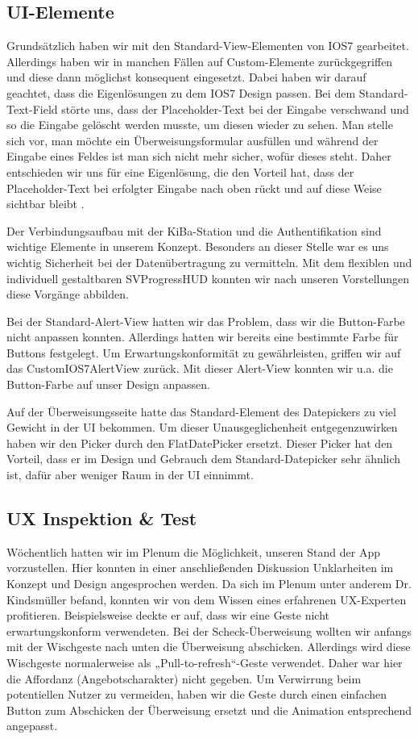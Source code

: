 \subsection{UI-Elemente}
	Grundsätzlich haben wir mit den Standard-View-Elementen von IOS7 gearbeitet. Allerdings haben wir in manchen Fällen auf Custom-Elemente zurückgegriffen und diese dann möglichst konsequent eingesetzt. Dabei haben wir darauf geachtet, dass die Eigenlösungen zu dem IOS7 Design passen. Bei dem Standard-Text-Field störte uns, dass der Placeholder-Text bei der Eingabe verschwand und so die Eingabe gelöscht werden musste, um diesen wieder zu sehen. Man stelle sich vor, man möchte ein Überweisungsformular ausfüllen und während der Eingabe eines Feldes ist man sich nicht mehr sicher, wofür dieses steht. Daher entschieden wir uns für eine Eigenlösung, die den Vorteil hat, dass der Placeholder-Text bei erfolgter Eingabe nach oben rückt und auf diese Weise sichtbar bleibt \citep{JV13}. 

 	Der Verbindungsaufbau mit der KiBa-Station und die Authentifikation sind wichtige Elemente in unserem Konzept. Besonders an dieser Stelle war es uns wichtig Sicherheit bei der Datenübertragung zu vermitteln. Mit dem flexiblen und individuell gestaltbaren SVProgressHUD \citep{SVHUD11} konnten wir nach unseren Vorstellungen diese Vorgänge abbilden.

	Bei der Standard-Alert-View hatten wir das Problem, dass wir die Button-Farbe nicht anpassen konnten. Allerdings hatten wir bereits eine bestimmte Farbe für Buttons festgelegt. Um Erwartungskonformität zu gewährleisten, griffen wir auf das CustomIOS7AlertView \citep{CustomAlertView13} zurück. Mit dieser Alert-View konnten wir u.a. die Button-Farbe auf unser Design anpassen.

	Auf der Überweisungsseite hatte das Standard-Element des Datepickers zu viel Gewicht in der UI bekommen. Um dieser Unausgeglichenheit entgegenzuwirken haben wir den Picker durch den FlatDatePicker \citep{FlatDate13} ersetzt. Dieser Picker hat den Vorteil, dass er im Design und Gebrauch dem Standard-Datepicker sehr ähnlich ist, dafür aber weniger Raum in der UI einnimmt.
 

\subsection{UX Inspektion \& Test}
	Wöchentlich hatten wir im Plenum die Möglichkeit, unseren Stand der App vorzustellen. Hier konnten in einer anschließenden Diskussion Unklarheiten im Konzept und Design angesprochen werden. Da sich im Plenum unter anderem Dr. Kindsmüller befand, konnten wir von dem Wissen eines erfahrenen UX-Experten profitieren. Beispielsweise deckte er auf, dass wir eine Geste nicht erwartungskonform verwendeten. Bei der Scheck-Überweisung wollten wir anfangs mit der Wischgeste nach unten die Überweisung abschicken. Allerdings wird diese Wischgeste normalerweise als „Pull-to-refresh“-Geste verwendet. Daher war hier die Affordanz (Angebotscharakter) nicht gegeben. Um Verwirrung beim potentiellen Nutzer zu vermeiden, haben wir die Geste durch einen einfachen Button zum Abschicken der Überweisung ersetzt und die Animation entsprechend angepasst.

